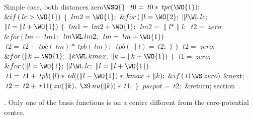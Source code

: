 \WY\WP\4\4Simple case, both distances zero\X \X${}\WSQ{}$\6
\6
$\>{t0}=\>{t0}\ast\>{tpc}(\WO{1});$\6
$\&{if}\,(\>{lc}>\WO{1})$\1\6
$\{$\6
$\>{lm2}=\WO{1};$\6
$\&{for}\,(\|l=\WO{2};$ $\|l\WL\>{lc};$ $\|l=\|l+\WO{1})$ \1\6
$\{$\6
$\>{lm1}=\>{lm2}+\WO{1};$\6
$\>{lm2}=\|l\ast\|l;$\6
$\>{t2}=\>{zero};$\6
$\&{for}\,(\>{lm}=\>{lm1};$ $\>{lm}\WL\>{lm2};$ $\>{lm}=\>{lm}+\WO{1})$ \1\6
$\>{t2}=\>{t2}+\>{tpc}(\>{lm})\ast\>{tpb}(\>{lm});$\2\6
$\>{tpb}(\|l)=\>{t2};$\6
$\}$\2\6
$\}$\2\6
$\>{t2}=\>{zero};$\6
$\&{for}\,(\|k=\WO{1};$ $\|k\WL\>{kmax};$ $\|k=\|k+\WO{1})$ \1\6
$\{$\6
$\>{t1}=\>{zero};$\6
$\&{for}\,(\|l=\WO{1};$ $\|l\WL\>{lc};$ $\|l=\|l+\WO{1})$ \1\6
$\>{t1}=\>{t1}+\>{tpb}(\|l)\ast\>{td}((\|l-\WO{1})\ast\>{kmax}+\|k);$\2\6
$\&{if}\,(\>{t1}\WS\>{zero})$\1\6
\&{next};\2\6
$\>{t2}=\>{t2}+\>{r11}(\>{zu}(\|k),\ \39\>{nu}(\|k))\ast\>{t1};$\6
$\}$\2\6
$\>{psepot}=\>{t2};$\6
\&{return};\WY\Wendc
\WU section~.
\fi %

. Only one of the basis functions is on a centre different from the
core-potential
centre.


